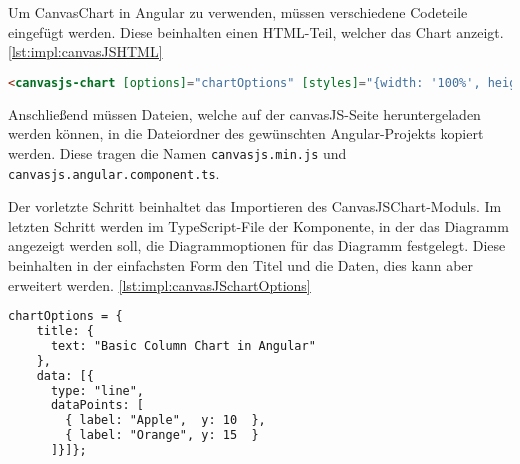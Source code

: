 Um CanvasChart in Angular zu verwenden, müssen verschiedene Codeteile eingefügt werden. Diese beinhalten einen HTML-Teil, welcher das Chart anzeigt. \ref{lst:impl:canvasJSHTML}
 
\begin{lstlisting}[language=html,caption=CanvasJS HTML,label=lst:impl:canvasJSHTML]
  <canvasjs-chart [options]="chartOptions" [styles]="{width: '100%', height: '360px'}"></canvasjs-chart>
\end{lstlisting}
 
Anschließend müssen Dateien, welche auf der canvasJS-Seite heruntergeladen werden können, in die Dateiordner des gewünschten Angular-Projekts kopiert werden. Diese tragen die Namen \texttt{canvasjs.min.js} und \texttt{canvasjs.angular.component.ts}.
 
Der vorletzte Schritt beinhaltet das Importieren des CanvasJSChart-Moduls.
Im letzten Schritt werden im TypeScript-File der Komponente, in der das Diagramm angezeigt werden soll, die Diagrammoptionen für das Diagramm festgelegt. Diese beinhalten in der einfachsten Form den Titel und die Daten, dies kann aber erweitert werden. \ref{lst:impl:canvasJSchartOptions}
 
\begin{lstlisting}[language=html,caption=CanvasJS chartOptiones,label=lst:impl:canvasJSchartOptions]
  chartOptions = {
    title: {
      text: "Basic Column Chart in Angular"
    },
    data: [{
      type: "line",
      dataPoints: [
        { label: "Apple",  y: 10  },
        { label: "Orange", y: 15  }
      ]}]};
\end{lstlisting}
 
\cite{canvasJsOfficialSite}